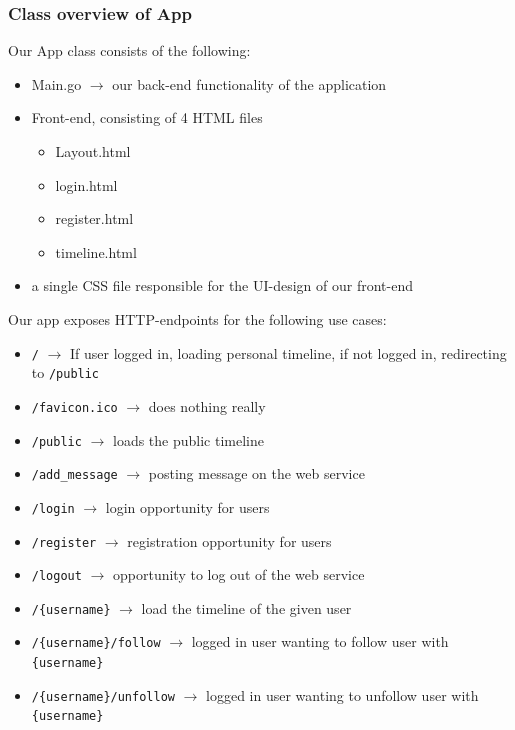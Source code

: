 \subsubsection*{Class overview of App}

Our App class consists of the following:

\begin{itemize}
    \item Main.go $\rightarrow$ our back-end functionality of the application
    \item Front-end, consisting of 4 HTML files
    \begin{itemize}
        \item Layout.html
        \item login.html
        \item register.html
        \item timeline.html
    \end{itemize}
    \item a single CSS file responsible for the UI-design of our front-end
\end{itemize}

Our app exposes HTTP-endpoints for the following use cases:

\begin{itemize}
    \item \texttt{/} $\rightarrow$ If user logged in, loading personal timeline, if not logged in, redirecting to \texttt{/public}
    \item \texttt{/favicon.ico} $\rightarrow$ does nothing really
    \item \texttt{/public} $\rightarrow$ loads the public timeline
    \item \texttt{/add\_message} $\rightarrow$ posting message on the web service
    \item \texttt{/login} $\rightarrow$ login opportunity for users
    \item \texttt{/register} $\rightarrow$ registration opportunity for users
    \item \texttt{/logout} $\rightarrow$ opportunity to log out of the web service
    \item \texttt{/\{username\}} $\rightarrow$ load the timeline of the given user
    \item \texttt{/\{username\}/follow} $\rightarrow$ logged in user wanting to follow user with  \texttt{\{username\}}
    \item \texttt{/\{username\}/unfollow} $\rightarrow$ logged in user wanting to unfollow user with \texttt{\{username\}}
\end{itemize}

